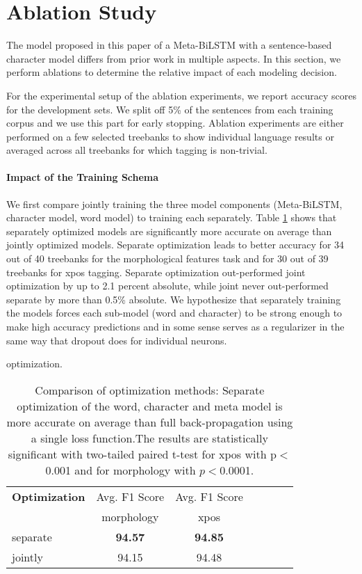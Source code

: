 \documentclass[11pt,a4paper]{article}
\begin{document}
\section{Ablation Study}

The model proposed in this paper of a Meta-BiLSTM with a sentence-based character model differs from prior work in multiple aspects.
In this section, we perform ablations to determine the relative impact of each modeling decision.



For the experimental setup of the ablation experiments, we report accuracy scores for the development sets. We split off 5\% of the sentences from each training corpus and we use this part for early stopping. Ablation experiments are either performed on a few selected treebanks to show individual language results or averaged across all treebanks for which tagging is non-trivial.


\paragraph{Impact of the Training Schema}
We first compare jointly training the three model components (Meta-BiLSTM, character model, word model)  to training each separately.
Table \ref{tab:ablation-opt-sep-full} shows that separately optimized models are significantly more accurate on average than jointly optimized models. 
Separate optimization leads to better accuracy for 34 out of 40 treebanks for the morphological features task and for 30 out of 39 treebanks for xpos tagging. Separate optimization out-performed joint optimization by up to 2.1 percent absolute, while joint never out-performed separate by more than 0.5\% absolute.
We hypothesize that separately training the models forces each sub-model (word and character) to be strong enough to make high accuracy predictions and in some sense serves as a regularizer in the same way that dropout does for individual neurons.

 optimization.
\begin{table}[ht!]
\begin{center}
\small
\setlength{\tabcolsep}{3.5pt}
\begin{tabular}{|l|c|c|c|c|c|c}
\hline 
 \bf Optimization   & Avg. F1 Score   & Avg. F1 Score \\ 
                    &  morphology &  xpos \\ \hline
separate  & \bf 94.57 &  \bf 94.85   \\
jointly   &     94.15  &  94.48    \\
 \hline
\end{tabular}
\end{center}
\caption{Comparison of optimization methods: Separate optimization of the word, character and meta model is more accurate on average than full back-propagation using a single loss function.The results are statistically significant with two-tailed paired t-test for xpos with p$<$0.001 and for morphology with $p<$0.0001.}
\label{tab:ablation-opt-sep-full}
\end{table}
\end{document}
